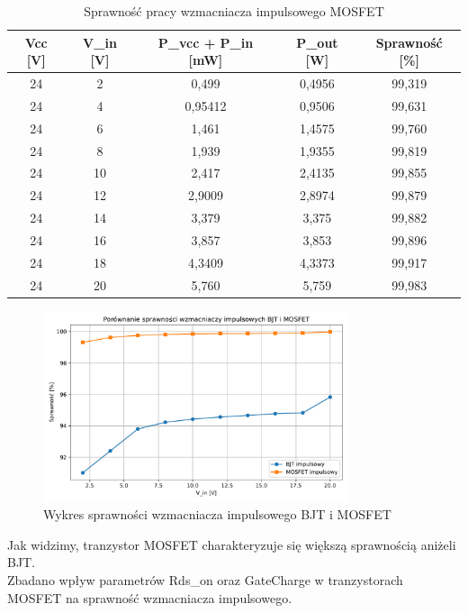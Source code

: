 \documentclass[11pt]{article}
\begin{document}
\begin{table}[H]
\centering
\begin{tabular}{|c|c|c|c|c|}
\hline
\textbf{Vcc [V]} & \textbf{V\_in [V]} & \textbf{P\_vcc + P\_in [mW]} & \textbf{P\_out [W]} & \textbf{Sprawność [\%]} \\
\hline
24 & 2  & 0{,}499    & 0{,}4956   & 99{,}319 \\
\hline
24 & 4  & 0{,}95412  & 0{,}9506   & 99{,}631 \\
\hline
24 & 6  & 1{,}461    & 1{,}4575   & 99{,}760 \\
\hline
24 & 8  & 1{,}939    & 1{,}9355   & 99{,}819 \\
\hline
24 & 10 & 2{,}417    & 2{,}4135   & 99{,}855 \\
\hline
24 & 12 & 2{,}9009   & 2{,}8974   & 99{,}879 \\
\hline
24 & 14 & 3{,}379    & 3{,}375    & 99{,}882 \\
\hline
24 & 16 & 3{,}857    & 3{,}853    & 99{,}896 \\
\hline
24 & 18 & 4{,}3409   & 4{,}3373   & 99{,}917 \\
\hline
24 & 20 & 5{,}760    & 5{,}759    & 99{,}983 \\
\hline
\end{tabular}
\caption{Sprawność pracy wzmacniacza impulsowego MOSFET}
\end{table}

\begin{figure}[H]
\centering
\includegraphics[width=0.8\textwidth]{aun1_imp_bjt_vs_mosfet.pdf}
\caption{Wykres sprawności wzmacniacza impulsowego BJT i MOSFET}
\end{figure}

Jak widzimy, tranzystor MOSFET charakteryzuje się większą sprawnością aniżeli BJT.\\

Zbadano wpływ parametrów Rds\_on oraz GateCharge w tranzystorach MOSFET
na sprawność wzmacniacza impulsowego. \\ 
\end{document}
